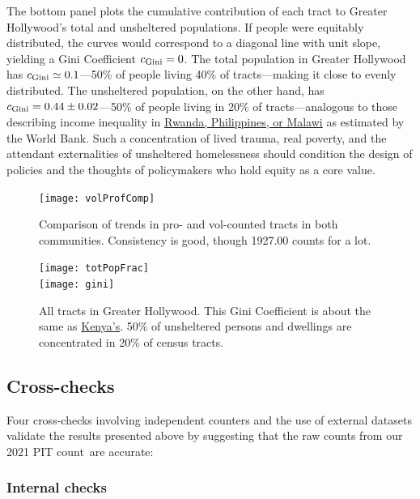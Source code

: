 \documentclass[11pt,twocolumn]{article}
\def\Count{count}
\begin{document}
The bottom panel plots the cumulative contribution of each tract to Greater Hollywood's
total and unsheltered populations. If people were equitably distributed, the curves would 
correspond to a diagonal line with unit slope, yielding a Gini Coefficient $c_{\rm Gini}=0$. 
The total population in Greater Hollywood has $c_{\rm Gini}\simeq0.1$---50\% of people 
living 40\% of tracts---making it close to evenly distributed. The unsheltered population, 
on the other hand, has $c_{\rm Gini}=0.44\pm0.02$---50\% of people living in 20\% of 
tracts---analogous to those describing income inequality in 
\href{https://en.wikipedia.org/wiki/List_of_countries_by_income_equality#UN,_World_Bank_and_CIA_list_\%E2\%80\%93_income_ratios_and_Gini_indices}{Rwanda, Philippines, or Malawi} 
as estimated by the World Bank. Such a concentration of lived trauma, real poverty, and the
attendant externalities of unsheltered homelessness should condition the design of policies
and the thoughts of policymakers who hold equity as a core value.

\begin{figure}[t]
	\centering
	\texttt{[image: volProfComp]}
	\caption{Comparison of trends in pro- and vol-counted tracts in both communities.
			Consistency is good, though 1927.00 counts for a lot.}
	\label{fig:proVolComp}
\end{figure}

\begin{figure}[t]
	\centering
	\texttt{[image: totPopFrac]}\\
	\texttt{[image: gini]}
	\caption{All tracts in Greater Hollywood. This Gini Coefficient
			is about the same as 
			\href{https://en.wikipedia.org/wiki/List_of_countries_by_income_equality}{Kenya's}.
			50\% of unsheltered persons and dwellings are concentrated in 20\% of census
			tracts.}
	\label{fig:gini}
\end{figure}

\subsection{Cross-checks}
\label{sec:crossChecks}

Four cross-checks involving independent counters and the use of external datasets validate the
results presented above by suggesting that the raw counts from our 2021 PIT \Count\ are accurate:

\subsubsection{Internal checks}
\end{document}
